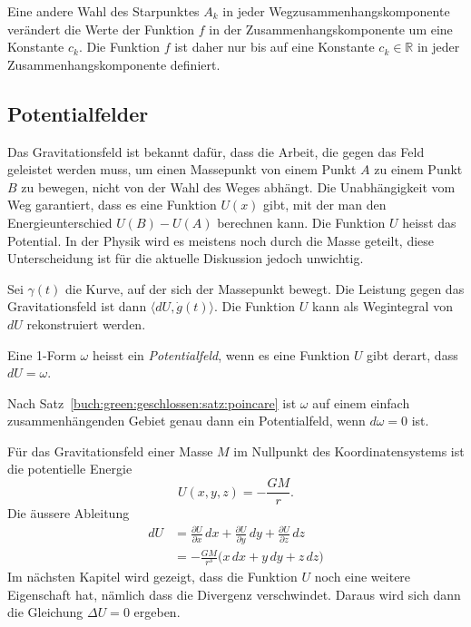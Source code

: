 Eine andere Wahl des Starpunktes $A_k$ in jeder Wegzusammenhangskomponente
verändert die Werte der Funktion $f$ in der Zusammenhangskomponente
um eine Konstante $c_k$.
Die Funktion $f$ ist daher nur bis auf eine Konstante $c_k\in\mathbb{R}$
in jeder Zusammenhangskomponente definiert.

%
%
\subsection{Potentialfelder}
Das Gravitationsfeld ist bekannt dafür, dass die Arbeit, die gegen
das Feld geleistet werden muss, um einen Massepunkt von einem Punkt $A$
zu einem Punkt $B$ zu bewegen, nicht von der Wahl des Weges abhängt.
Die Unabhängigkeit vom Weg garantiert, dass es
eine Funktion $U(x)$ gibt, mit der man den Energieunterschied
$U(B)-U(A)$ berechnen kann.
Die Funktion $U$ heisst das Potential.
In der Physik wird es meistens noch durch die Masse geteilt,
diese Unterscheidung ist für die aktuelle Diskussion jedoch unwichtig.

Sei $\gamma(t)$ die Kurve, auf der sich der Massepunkt 
bewegt.
Die Leistung gegen das Gravitationsfeld ist dann
$\langle dU, \dot{g}(t)\rangle$.
Die Funktion $U$ kann als Wegintegral von $dU$ rekonstruiert werden.

\begin{definition}[Potentialfeld]
Eine 1-Form $\omega$ heisst ein {\em Potentialfeld}, wenn es eine
Funktion $U$ gibt derart, dass $dU=\omega$.
%
\end{definition}

Nach Satz~\ref{buch:green:geschlossen:satz:poincare} ist $\omega$
auf einem einfach zusammenhängenden Gebiet genau dann ein Potentialfeld,
wenn $d\omega=0$ ist.

\begin{beispiel}
Für das Gravitationsfeld einer Masse $M$ im Nullpunkt des Koordinatensystems
%
ist die potentielle Energie
\[
U(x,y,z)
=
-\frac{GM}{r}.
\]
Die äussere Ableitung 
\begin{align*}
dU
&=
\frac{\partial U}{\partial x}\,dx
+
\frac{\partial U}{\partial y}\,dy
+
\frac{\partial U}{\partial z}\,dz
\\
&=
-\frac{GM}{r^3}\bigl(
x\,dx
+
y\,dy
+
z\,dz
\bigr)
\end{align*}
Im nächsten Kapitel wird gezeigt, dass die Funktion $U$ noch eine
weitere Eigenschaft hat, nämlich dass die Divergenz verschwindet.
Daraus wird sich dann die Gleichung $\Delta U=0$ ergeben.
\end{beispiel}

